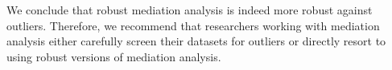 \documentclass[12pt]{article}
\begin{document}
We conclude that robust mediation analysis is indeed more robust against outliers. Therefore, we recommend that researchers working with mediation analysis either carefully screen their datasets for outliers or directly resort to using robust versions of mediation analysis.







\end{document}
